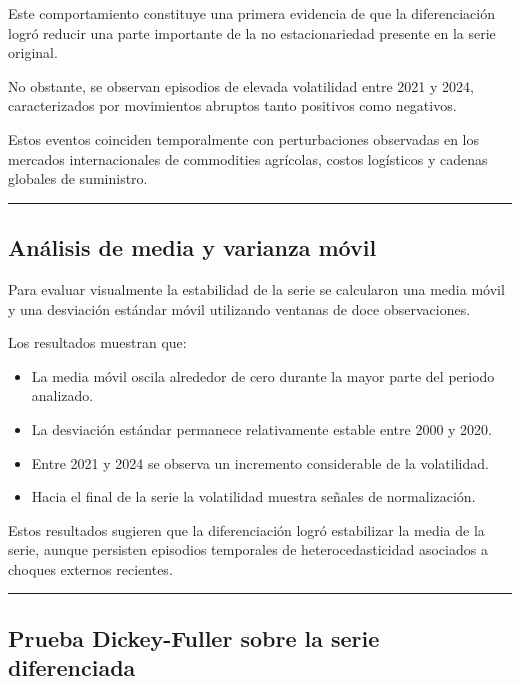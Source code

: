 \documentclass[11pt]{article}
\providecommand{\tightlist}{%
      \setlength{\itemsep}{0pt}\setlength{\parskip}{0pt}}
\begin{document}
Este comportamiento constituye una primera evidencia de que la
diferenciación logró reducir una parte importante de la no
estacionariedad presente en la serie original.

No obstante, se observan episodios de elevada volatilidad entre 2021 y
2024, caracterizados por movimientos abruptos tanto positivos como
negativos.

Estos eventos coinciden temporalmente con perturbaciones observadas en
los mercados internacionales de commodities agrícolas, costos logísticos
y cadenas globales de suministro.

\begin{center}\rule{0.5\linewidth}{0.5pt}\end{center}

\hypertarget{anuxe1lisis-de-media-y-varianza-muxf3vil}{%
\subsection{Análisis de media y varianza
móvil}\label{anuxe1lisis-de-media-y-varianza-muxf3vil}}

Para evaluar visualmente la estabilidad de la serie se calcularon una
media móvil y una desviación estándar móvil utilizando ventanas de doce
observaciones.

Los resultados muestran que:

\begin{itemize}
\tightlist
\item
  La media móvil oscila alrededor de cero durante la mayor parte del
  periodo analizado.
\item
  La desviación estándar permanece relativamente estable entre 2000 y
  2020.
\item
  Entre 2021 y 2024 se observa un incremento considerable de la
  volatilidad.
\item
  Hacia el final de la serie la volatilidad muestra señales de
  normalización.
\end{itemize}

Estos resultados sugieren que la diferenciación logró estabilizar la
media de la serie, aunque persisten episodios temporales de
heterocedasticidad asociados a choques externos recientes.

\begin{center}\rule{0.5\linewidth}{0.5pt}\end{center}

\hypertarget{prueba-dickey-fuller-sobre-la-serie-diferenciada}{%
\subsection{Prueba Dickey-Fuller sobre la serie
diferenciada}\label{prueba-dickey-fuller-sobre-la-serie-diferenciada}}
\end{document}

